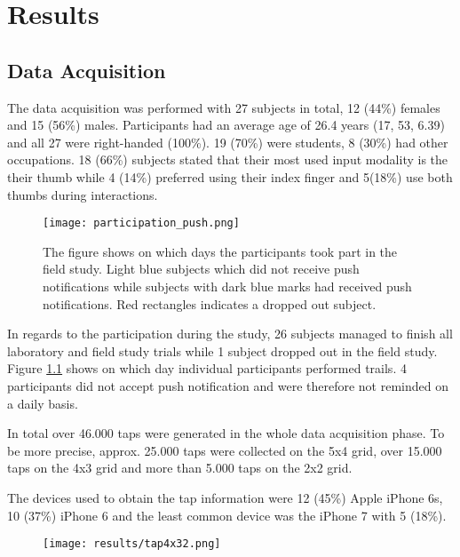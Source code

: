 \chapter{Results\label{cha:chapter6}}
\section{Data Acquisition}
The data acquisition was performed with 27 subjects in total, 12 (44\%) females and 15 (56\%) males. Participants had an average age of 26.4 years (17, 53, 6.39) and all 27 were right-handed (100\%). 19 (70\%) were students, 8 (30\%) had other occupations.
18 (66\%) subjects stated that their most used input modality is the their thumb while 4 (14\%) preferred using their index finger and 5(18\%) use both thumbs during interactions.\\

\begin{figure}[h!]
  \centering
  \texttt{[image: participation\_push.png]}
  \caption{The figure shows on which days the participants took part in the field study. Light blue subjects which did not receive push notifications while subjects with dark blue marks had received push notifications. Red rectangles indicates a dropped out subject.} \label{fig:participation}
\end{figure}

In regards to the participation during the study, 26 subjects managed to finish all laboratory and field study trials while 1 subject dropped out in the field study. Figure \ref{fig:participation} shows on which day individual participants performed trails. 4 participants did not accept push notification and were therefore not reminded on a daily basis.

In total over 46.000 taps were generated in the whole data acquisition phase. To be more precise, approx. 25.000 taps were collected on the 5x4 grid, over 15.000 taps on the 4x3 grid and more than 5.000 taps on the 2x2 grid.

The devices used to obtain the tap information were 12 (45\%) Apple iPhone 6s, 10 (37\%) iPhone 6 and the least common device was the iPhone 7 with 5 (18\%).

\begin{figure}[h!]
  \centering
  \texttt{[image: results/tap4x32.png]}
  \caption{ } \label{fig:taps}
\end{figure}


